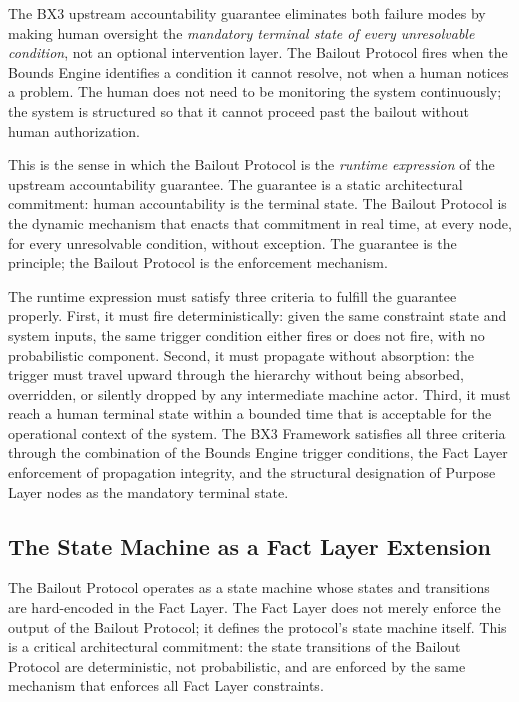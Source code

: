 The BX3 upstream accountability guarantee eliminates both failure modes by making human oversight the \textit{mandatory terminal state of every unresolvable condition}, not an optional intervention layer. The Bailout Protocol fires when the Bounds Engine identifies a condition it cannot resolve, not when a human notices a problem. The human does not need to be monitoring the system continuously; the system is structured so that it cannot proceed past the bailout without human authorization.

This is the sense in which the Bailout Protocol is the \textit{runtime expression} of the upstream accountability guarantee. The guarantee is a static architectural commitment: human accountability is the terminal state. The Bailout Protocol is the dynamic mechanism that enacts that commitment in real time, at every node, for every unresolvable condition, without exception. The guarantee is the principle; the Bailout Protocol is the enforcement mechanism.

The runtime expression must satisfy three criteria to fulfill the guarantee properly. First, it must fire deterministically: given the same constraint state and system inputs, the same trigger condition either fires or does not fire, with no probabilistic component. Second, it must propagate without absorption: the trigger must travel upward through the hierarchy without being absorbed, overridden, or silently dropped by any intermediate machine actor. Third, it must reach a human terminal state within a bounded time that is acceptable for the operational context of the system. The BX3 Framework satisfies all three criteria through the combination of the Bounds Engine trigger conditions, the Fact Layer enforcement of propagation integrity, and the structural designation of Purpose Layer nodes as the mandatory terminal state.

\subsection{The State Machine as a Fact Layer Extension}
\label{sec:state-machine}

The Bailout Protocol operates as a state machine whose states and transitions are hard-encoded in the Fact Layer. The Fact Layer does not merely enforce the output of the Bailout Protocol; it defines the protocol's state machine itself. This is a critical architectural commitment: the state transitions of the Bailout Protocol are deterministic, not probabilistic, and are enforced by the same mechanism that enforces all Fact Layer constraints.

